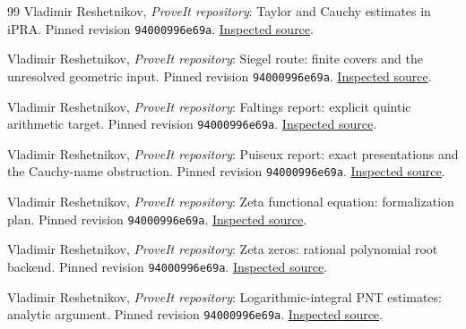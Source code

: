 \begin{thebibliography}{99}
 Vladimir Reshetnikov, \emph{ProveIt repository}: Taylor and Cauchy estimates in iPRA. Pinned revision \texttt{94000996e69a}. \href{https://github.com/VladimirReshetnikov/ProveIt/blob/94000996e69ab0c527393a1d02a4a037a4eb0493/Logic/PrimitiveRecursiveArithmetic/docs/proofs/analysis/taylor_cauchy_ipra/report.tex}{Inspected source}.

 Vladimir Reshetnikov, \emph{ProveIt repository}: Siegel route: finite covers and the unresolved geometric input. Pinned revision \texttt{94000996e69a}. \href{https://github.com/VladimirReshetnikov/ProveIt/blob/94000996e69ab0c527393a1d02a4a037a4eb0493/Logic/PrimitiveRecursiveArithmetic/docs/proofs/diophantine-number-theory/siegel_ipra/paper/05_general_route.tex}{Inspected source}.

 Vladimir Reshetnikov, \emph{ProveIt repository}: Faltings report: explicit quintic arithmetic target. Pinned revision \texttt{94000996e69a}. \href{https://github.com/VladimirReshetnikov/ProveIt/blob/94000996e69ab0c527393a1d02a4a037a4eb0493/Logic/PrimitiveRecursiveArithmetic/docs/proofs/diophantine-number-theory/faltings_ipra/faltings_ipra.tex}{Inspected source}.

 Vladimir Reshetnikov, \emph{ProveIt repository}: Puiseux report: exact presentations and the Cauchy-name obstruction. Pinned revision \texttt{94000996e69a}. \href{https://github.com/VladimirReshetnikov/ProveIt/blob/94000996e69ab0c527393a1d02a4a037a4eb0493/Logic/PrimitiveRecursiveArithmetic/docs/proofs/algebra/puiseux_ipra/puiseux_ipra.tex}{Inspected source}.

 Vladimir Reshetnikov, \emph{ProveIt repository}: Zeta functional equation: formalization plan. Pinned revision \texttt{94000996e69a}. \href{https://github.com/VladimirReshetnikov/ProveIt/blob/94000996e69ab0c527393a1d02a4a037a4eb0493/Logic/PrimitiveRecursiveArithmetic/docs/proofs/analytic-number-theory/zeta_functional_equation_ipra/formalization_plan.md}{Inspected source}.

 Vladimir Reshetnikov, \emph{ProveIt repository}: Zeta zeros: rational polynomial root backend. Pinned revision \texttt{94000996e69a}. \href{https://github.com/VladimirReshetnikov/ProveIt/blob/94000996e69ab0c527393a1d02a4a037a4eb0493/Logic/PrimitiveRecursiveArithmetic/docs/proofs/analytic-number-theory/zeta_zeros_ipra_2026-11-15/sections/polynomial_algebra.tex}{Inspected source}.

 Vladimir Reshetnikov, \emph{ProveIt repository}: Logarithmic-integral PNT estimates: analytic argument. Pinned revision \texttt{94000996e69a}. \href{https://github.com/VladimirReshetnikov/ProveIt/blob/94000996e69ab0c527393a1d02a4a037a4eb0493/Logic/PrimitiveRecursiveArithmetic/docs/proofs/analytic-number-theory/pnt_li_ipra_2026-11-15/tex/analytic.tex}{Inspected source}.


\end{thebibliography}
